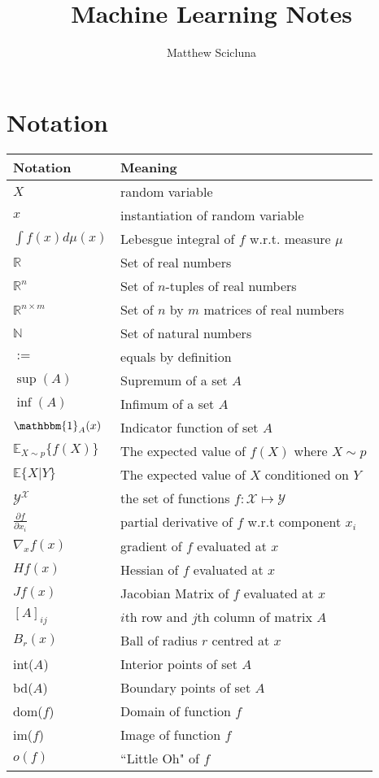\documentclass[]{article}
\theoremstyle{mattstyle}
\theoremstyle{definition}
\begin{document}
\title{Machine Learning Notes}
\author{Matthew Scicluna}
\maketitle

\newpage

\tableofcontents

\newpage

\section{Notation}

	\begin{center}		
		\begin{tabular}{*2l}   
			\toprule
			Notation & Meaning
			\\\midrule
			$X$ & random variable \\
			$x$ & instantiation of random variable\\
			$\int f(x) d\mu(x)$ & Lebesgue integral of $f$ w.r.t. measure $\mu$\\
			$\mathbb{R}$ & Set of real numbers\\
			$\mathbb{R}^n$ & Set of $n$-tuples of real numbers\\
			$\mathbb{R}^{n\times m}$ & Set of $n$ by $m$ matrices of real numbers\\
			$\mathbb{N}$ & Set of natural numbers \\
			$:=$ & equals by definition \\
			$\sup(A)$ & Supremum of a set $A$ \\
			$\inf(A)$ & Infimum of a set $A$ \\
			$\mathbbm{1}_{A}(x)$ & Indicator function of set $A$ \\
			$\mathbb{E}_{X\sim p}\{f(X)\}$ & The expected value of $f(X)$ where $X\sim p$\\
			$\mathbb{E}\{X|Y\}$ & The expected value of $X$ conditioned on $Y$ \\
			$\mathcal{Y}^\mathcal{X}$ & the set of functions $f: \mathcal{X}\mapsto \mathcal{Y}$\\
			$\frac{\partial f}{\partial x_i}$ & partial derivative of $f$ w.r.t component $x_i$\\
			$\nabla_{x} f(x)$ & gradient of $f$ evaluated at $x$\\
			$Hf(x)$ & Hessian of $f$ evaluated at $x$\\
			$Jf(x)$ & Jacobian Matrix of $f$ evaluated at $x$\\
			$[A]_{ij}$ & $i$th row and $j$th column of matrix $A$ \\
			$B_r(x)$ & Ball of radius $r$ centred at $x$ \\
			int($A$) & Interior points of set $A$ \\
			bd($A$) & Boundary points of set $A$ \\
			dom($f$) & Domain of function $f$ \\
			im($f$) & Image of function $f$ \\
			$o(f)$ & ``Little Oh" of $f$
			\\\bottomrule
			\hline
		\end{tabular}
	\end{center}
\end{document}
